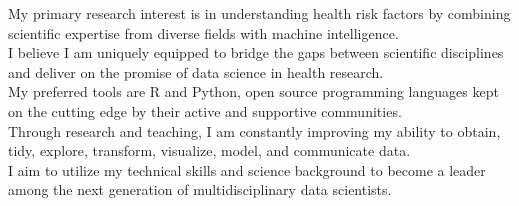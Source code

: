 \vspace{0.2cm}
\begin{cvparagraph}


My primary research interest is in understanding health risk factors by combining scientific expertise from diverse fields with machine intelligence.\\ I believe I am uniquely equipped to bridge the gaps between scientific disciplines and deliver on the promise of data science in health research.\\ My preferred tools are R and Python, open source programming languages kept on the cutting edge by their active and supportive communities.\\ Through research and teaching, I am constantly improving my ability to obtain, tidy, explore, transform, visualize, model, and communicate data.\\  I aim to utilize my technical skills and science background to become a leader among the next generation of multidisciplinary data scientists.
\end{cvparagraph}
